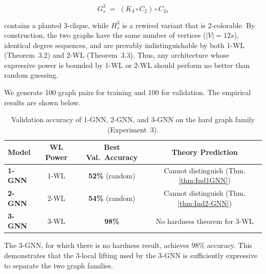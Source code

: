 \[
G^3_s \;=\; (K_3 \,\square\, C_2) \,\square\, C_{2s}
\]


contains a planted 3-clique, while $H^3_s$ is a rewired variant that is 2-colorable. By construction, the two graphs have the same number of vertices ($|V| = 12s$), identical degree sequences, and are provably indistinguishable by both 1-WL (Theorem~3.2) and 2-WL (Theorem~3.3). Thus, any architecture whose expressive power is bounded by 1-WL or 2-WL should perform no better than random guessing.

We generate 100 graph pairs for training and 100 for validation. The empirical results are shown below.

\begin{table}[h]
\centering
\begin{tabular}{lccc}
\toprule
\textbf{Model} & \textbf{WL Power} & \textbf{Best Val.\ Accuracy} & \textbf{Theory Prediction} \\
\midrule
\textbf{1-GNN} & 1-WL & \textbf{52\%} (random) & Cannot distinguish (Thm.\ref{thm:Ind1GNN}) \\
\textbf{2-GNN} & 2-WL & \textbf{54\%} (random) & Cannot distinguish (Thm.\ref{thm:Ind2-GNN}) \\
\textbf{3-GNN} & 3-WL & \textbf{98\%} & No hardness theorem for 3-WL \\
\bottomrule
\end{tabular}
\caption{Validation accuracy of 1-GNN, 2-GNN, and 3-GNN on the hard graph family (Experiment~3).}
\label{tab:exp3_results}
\end{table}



The 3-GNN, for which there is no hardness result, achieves 98\% accuracy. This demonstrates that the 3-local lifting used by the 3-GNN is sufficiently expressive to separate the two graph families.









